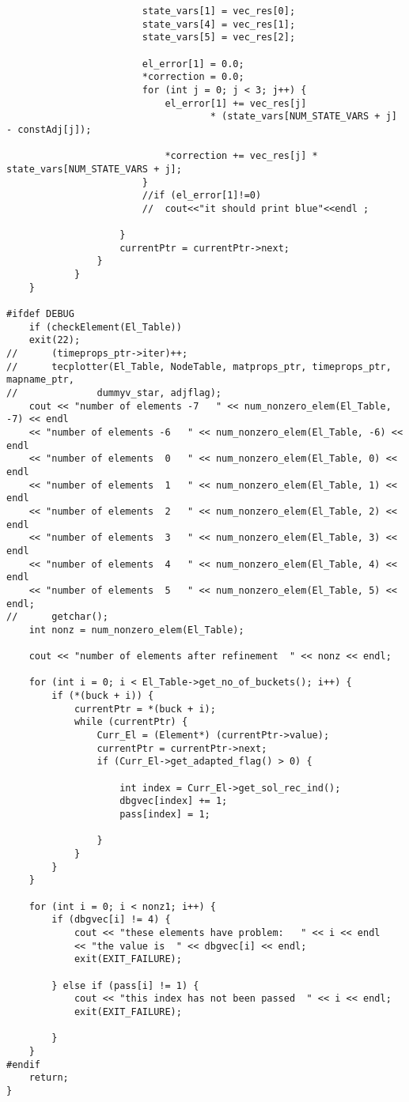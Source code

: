 \documentclass[a4paper,10pt]{article}
\begin{document}
\begin{lstlisting}
						state_vars[1] = vec_res[0];
						state_vars[4] = vec_res[1];
						state_vars[5] = vec_res[2];

						el_error[1] = 0.0;
						*correction = 0.0;
						for (int j = 0; j < 3; j++) {
							el_error[1] += vec_res[j]
									* (state_vars[NUM_STATE_VARS + j] - constAdj[j]);

							*correction += vec_res[j] * state_vars[NUM_STATE_VARS + j];
						}
						//if (el_error[1]!=0)
						//	cout<<"it should print blue"<<endl ;

					}
					currentPtr = currentPtr->next;
				}
			}
	}

#ifdef DEBUG
	if (checkElement(El_Table))
	exit(22);
//		(timeprops_ptr->iter)++;
//		tecplotter(El_Table, NodeTable, matprops_ptr, timeprops_ptr, mapname_ptr,
//				dummyv_star, adjflag);
	cout << "number of elements -7   " << num_nonzero_elem(El_Table, -7) << endl
	<< "number of elements -6   " << num_nonzero_elem(El_Table, -6) << endl
	<< "number of elements  0   " << num_nonzero_elem(El_Table, 0) << endl
	<< "number of elements  1   " << num_nonzero_elem(El_Table, 1) << endl
	<< "number of elements  2   " << num_nonzero_elem(El_Table, 2) << endl
	<< "number of elements  3   " << num_nonzero_elem(El_Table, 3) << endl
	<< "number of elements  4   " << num_nonzero_elem(El_Table, 4) << endl
	<< "number of elements  5   " << num_nonzero_elem(El_Table, 5) << endl;
//		getchar();
	int nonz = num_nonzero_elem(El_Table);

	cout << "number of elements after refinement  " << nonz << endl;

	for (int i = 0; i < El_Table->get_no_of_buckets(); i++) {
		if (*(buck + i)) {
			currentPtr = *(buck + i);
			while (currentPtr) {
				Curr_El = (Element*) (currentPtr->value);
				currentPtr = currentPtr->next;
				if (Curr_El->get_adapted_flag() > 0) {

					int index = Curr_El->get_sol_rec_ind();
					dbgvec[index] += 1;
					pass[index] = 1;

				}
			}
		}
	}

	for (int i = 0; i < nonz1; i++) {
		if (dbgvec[i] != 4) {
			cout << "these elements have problem:   " << i << endl
			<< "the value is  " << dbgvec[i] << endl;
			exit(EXIT_FAILURE);

		} else if (pass[i] != 1) {
			cout << "this index has not been passed  " << i << endl;
			exit(EXIT_FAILURE);

		}
	}
#endif
	return;
}
\end{lstlisting}
\end{document}
